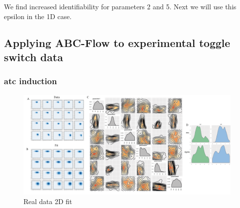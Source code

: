 We find increased identifiability for parameters 2 and 5. Next we will use this epsilon in the 1D case.

\clearpage


\subsection{Applying ABC-Flow to experimental toggle switch data}
 
 
  \subsubsection{\acrshort{atc} induction}
 
 
 \begin{figure}[htbp]
\centering
\includegraphics[scale=0.5]{chapterABCFlow/images/real_dat/real_dat_2D.png}
\caption[LoF caption]{Real data 2D fit}
\label{fig:real_dat_2d}
\end{figure}
\clearpage
 
 